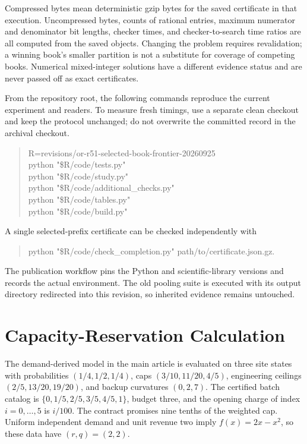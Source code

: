 Compressed bytes mean deterministic gzip bytes for the saved certificate in that execution. Uncompressed bytes, counts of rational entries, maximum numerator and denominator bit lengths, checker times, and checker-to-search time ratios are all computed from the saved objects. Changing the problem requires revalidation; a winning book's smaller partition is not a substitute for coverage of competing books. Numerical mixed-integer solutions have a different evidence status and are never passed off as exact certificates.

From the repository root, the following commands reproduce the current experiment and readers. To measure fresh timings, use a separate clean checkout and keep the protocol unchanged; do not overwrite the committed record in the archival checkout.
\begin{quote}\small\ttfamily
R=revisions/or-r51-selected-book-frontier-20260925\\
python "\$R/code/tests.py"\\
python "\$R/code/study.py"\\
python "\$R/code/additional\_checks.py"\\
python "\$R/code/tables.py"\\
python "\$R/code/build.py"
\end{quote}
A single selected-prefix certificate can be checked independently with
\begin{quote}\small\ttfamily
python "\$R/code/check\_completion.py" path/to/certificate.json.gz.
\end{quote}
The publication workflow pins the Python and scientific-library versions and records the actual environment. The old pooling suite is executed with its output directory redirected into this revision, so inherited evidence remains untouched.

\section{Capacity-Reservation Calculation}\label{sec:r51-capacity-data}
The demand-derived model in the main article is evaluated on three site states with probabilities $(1/4,1/2,1/4)$, caps $(3/10,11/20,4/5)$, engineering ceilings $(2/5,13/20,19/20)$, and backup curvatures $(0,2,7)$. The certified batch catalog is $\{0,1/5,2/5,3/5,4/5,1\}$, budget three, and the opening charge of index $i=0,\ldots,5$ is $i/100$. The contract promises nine tenths of the weighted cap. Uniform independent demand and unit revenue two imply $f(x)=2x-x^2$, so these data have $(r,q)=(2,2)$.

